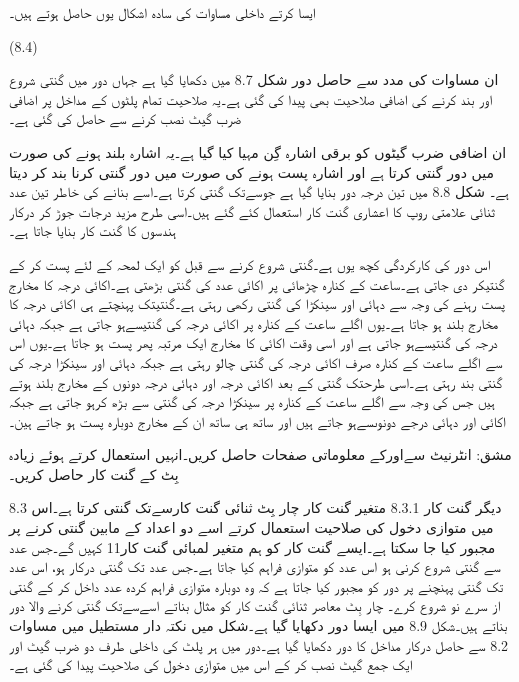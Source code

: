 	ایسا کرتے داخلی مساوات کی سادہ اشکال یوں حاصل ہوتے ہیں۔

 
(8.4)

ان مساوات کی مدد سے حاصل دور شکل 8.7 میں دکھایا گیا ہے جہاں دور میں گنتی شروع اور بند کرنے کی اضافی صلاحیت بھی پیدا کی گئی ہے۔یہ صلاحیت تمام پلٹوں کے مداخل پر اضافی ضرب گیٹ نصب کرنے سے حاصل کی گئی ہے۔



	ان اضافی ضرب گیٹوں کو برقی اشارہ گِن مہیا کیا گیا ہے۔یہ اشارہ بلند ہونے کی صورت میں دور گنتی کرتا ہے اور اشارہ پست ہونے کی صورت میں دور گنتی کرنا بند کر دیتا ہے۔
	شکل 8.8 میں تین درجہ دور بنایا گیا ہے جوسےتک گنتی کرتا ہے۔اسے بنانے کی خاطر تین عدد ثنائی علامتی روپ کا اعشاری  گنت کار استعمال کئے گئے ہیں۔اسی طرح مزید درجات جوڑ کر درکار ہندسوں کا  گنت کار بنایا جاتا ہے۔ 



	اس دور کی کارکردگی کچھ یوں ہے۔گنتی شروع کرنے سے قبل کو ایک لمحہ کے لئے پست کر کے گنتیکر دی جاتی ہے۔ساعت کے کنارہ چڑھائی پر اکائی عدد کی گنتی بڑھتی ہے۔اکائی درجہ کا مخارج پست رہنے کی وجہ سے دہائی اور سینکڑا کی گنتی رکھی رہتی ہے۔گنتیتک پہنچتے ہی اکائی درجہ کا مخارج بلند ہو جاتا ہے۔یوں اگلے ساعت کے کنارہ پر اکائی درجہ کی گنتیسےہو جاتی ہے جبکہ دہائی درجہ کی گنتیسےہو جاتی ہے اور اسی وقت اکائی کا مخارج ایک مرتبہ پھر پست ہو جاتا ہے۔یوں اس سے اگلے ساعت کے کنارہ صرف اکائی درجہ کی گنتی چالو رہتی ہے جبکہ دہائی اور سینکڑا درجہ کی گنتی بند رہتی ہے۔اسی طرحتک گنتی کے بعد اکائی درجہ اور دہائی درجہ دونوں کے مخارج بلند ہوتے ہیں جس کی وجہ سے اگلے ساعت کے کنارہ پر سینکڑا درجہ کی گنتی سے بڑھ کرہو جاتی ہے جبکہ اکائی اور دہائی درجے دونوںسےہو جاتے ہیں اور ساتھ ہی ساتھ ان کے مخارج  دوبارہ پست ہو جاتے ہین۔

مشق:	انٹرنیٹ سےاورکے معلوماتی صفحات حاصل کریں۔انہیں استعمال کرتے ہوئے زیادہ بِٹ کے گنت کار حاصل کریں۔

8.3 دیگر گنت کار
8.3.1 متغیر گنت کار
	چار بِٹ ثنائی گنت کارسےتک گنتی کرتا ہے۔اس میں متوازی دخول کی صلاحیت استعمال کرتے اسے دو اعداد کے مابین گنتی کرنے پر مجبور کیا جا سکتا ہے۔ایسے گنت کار کو ہم متغیر لمبائی گنت کار11 کہیں گے۔جس عدد سے گنتی شروع کرنی ہو اس عدد کو متوازی فراہم کیا جاتا ہے۔جس عدد تک گنتی درکار ہو، اس عدد تک گنتی پہنچنے پر دور کو مجبور کیا جاتا ہے کہ وہ دوبارہ متوازی فراہم کردہ عدد داخل کر کے گنتی از سرے نو شروع کرے۔
	چار بِٹ معاصر ثنائی گنت کار کو مثال بناتے اسےسےتک گنتی کرنے والا دور بناتے ہیں۔شکل 8.9 میں ایسا دور دکھایا گیا ہے۔شکل میں نکتہ دار مستطیل میں مساوات 8.2 سے حاصل درکار مداخل کا دور دکھایا گیا ہے۔دور میں ہر پلٹ کی داخلی طرف دو ضرب گیٹ اور ایک جمع گیٹ نصب کر کے اس میں متوازی دخول کی صلاحیت پیدا کی گئی ہے۔

